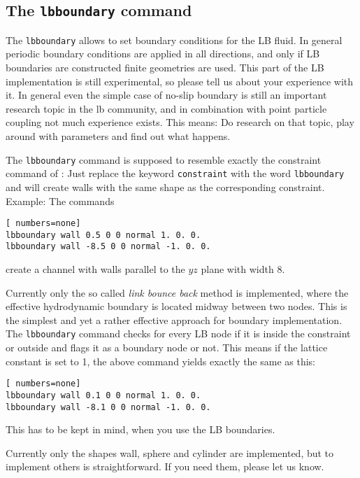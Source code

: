 \subsection*{The \lstinline|lbboundary| command}
The \lstinline|lbboundary| allows to set boundary conditions for the LB fluid. In general
periodic boundary conditions are applied in all directions, and only if LB boundaries
are constructed finite geometries are used. This part of the LB implementation is still experimental,
so please tell us about your experience with it. In general even the simple case of no-slip
boundary is still an important research topic in the lb community, and in combination with
point particle coupling not much experience exists. This means: Do research on that topic, play
around with parameters and find out what happens. 


The \lstinline|lbboundary| command is supposed to resemble exactly the constraint command of 
\ES{}: Just replace the keyword \lstinline|constraint| with the word \lstinline|lbboundary| 
and \ES{} will create walls with the same shape as the corresponding constraint. Example:
The commands
\begin{lstlisting}[ numbers=none]
lbboundary wall 0.5 0 0 normal 1. 0. 0. 
lbboundary wall -8.5 0 0 normal -1. 0. 0. 
\end{lstlisting}
create a channel with walls parallel to the $yz$ plane with width 8.

Currently only the so called \emph{link bounce back} method is implemented, where the effective
hydrodynamic boundary is located midway between two nodes. This is the simplest and yet a 
rather effective approach for boundary implementation. The \lstinline|lbboundary| command
checks for every LB node if it is inside the constraint or outside and flags it as a boundary
node or not. This means if the lattice constant is set to 1, the above command yields exactly
the same as this:
\begin{lstlisting}[ numbers=none]
lbboundary wall 0.1 0 0 normal 1. 0. 0. 
lbboundary wall -8.1 0 0 normal -1. 0. 0. 
\end{lstlisting}
This has to be kept in mind, when you use the LB boundaries.

Currently only the shapes wall, sphere and cylinder are implemented, but to implement others 
is straightforward. If you need them, please let us know.
